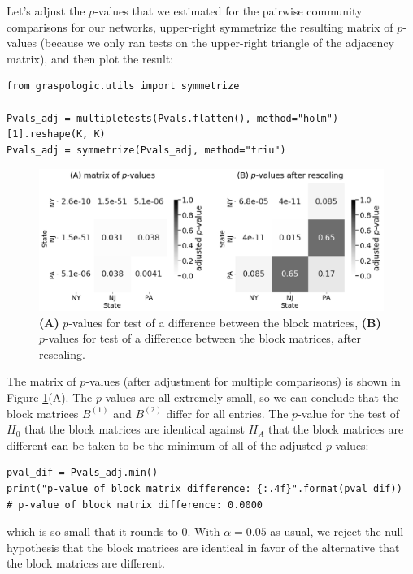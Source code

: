 Let's adjust the $p$-values that we estimated for the pairwise community comparisons for our networks, upper-right symmetrize the resulting matrix of $p$-values (because we only ran tests on the upper-right triangle of the adjacency matrix), and then plot the result:
\begin{lstlisting}[style=python]
from graspologic.utils import symmetrize

Pvals_adj = multipletests(Pvals.flatten(), method="holm")[1].reshape(K, K)
Pvals_adj = symmetrize(Pvals_adj, method="triu")
\end{lstlisting}

\begin{figure}
    \centering
    \includegraphics[width=\linewidth]{applications/ch8/Images/twosamp_sbm_pvals.png}
    \caption[$p$-values for differences between block matrices]{\textbf{(A)} $p$-values for test of a difference between the block matrices, \textbf{(B)} $p$-values for test of a difference between the block matrices, after rescaling.}
    \label{fig:ch8:twosampsbm:pval_mtx}
\end{figure}

The matrix of $p$-values (after adjustment for multiple comparisons) is shown in Figure \ref{fig:ch8:twosampsbm:pval_mtx}(A). The $p$-values are all extremely small, so we can conclude that the block matrices $B^{(1)}$ and $B^{(2)}$ differ for all entries. The $p$-value for the test of $H_0$ that the block matrices are identical against $H_A$ that the block matrices are different can be taken to be the minimum of all of the adjusted $p$-values:

\begin{lstlisting}[style=python]
pval_dif = Pvals_adj.min()
print("p-value of block matrix difference: {:.4f}".format(pval_dif))
# p-value of block matrix difference: 0.0000
\end{lstlisting}
which is so small that it rounds to $0$. With $\alpha = 0.05$ as usual, we reject the null hypothesis that the block matrices are identical in favor of the alternative that the block matrices are different. 

